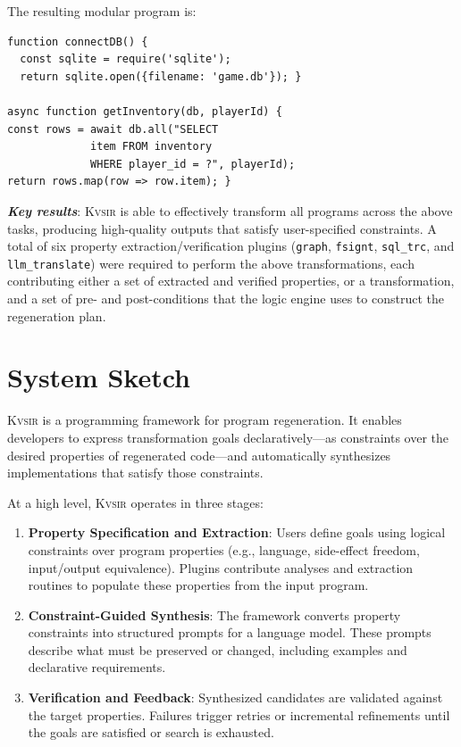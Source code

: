 \documentclass[sigplan,review,anonymous,10pt]{acmart}
\newcommand{\sys}{{\scshape Kv{\textalpha}sir}\xspace}
\newcommand{\heading}[1]{\vspace{2pt}\noindent\textbf{\emph{#1}}:\enspace}
\newcommand{\ttt}[1]{\texttt{#1}\xspace}
\begin{document}
The resulting modular program is:
\begin{verbatim}
function connectDB() {
  const sqlite = require('sqlite');
  return sqlite.open({filename: 'game.db'}); }

async function getInventory(db, playerId) {
const rows = await db.all("SELECT 
             item FROM inventory
             WHERE player_id = ?", playerId);
return rows.map(row => row.item); }
\end{verbatim}

\heading{Key results}
\sys is able to effectively transform all programs across the above tasks,
producing high-quality outputs that satisfy user-specified constraints.
A total
of six property extraction/verification plugins (\ttt{graph}, \ttt{fsignt}, \ttt{sql\_trc}, and \ttt{llm\_translate})
were required to perform the above transformations, each
contributing either a set of extracted and verified properties, or a
transformation, and a set of pre- and post-conditions that the logic engine
uses to construct the regeneration plan.

\section{System Sketch}
\label{sec:design}

\sys is a programming framework for program regeneration. It enables developers to express transformation goals declaratively—as constraints over the desired properties of regenerated code—and automatically synthesizes implementations that satisfy those constraints.

At a high level, \sys operates in three stages:

\begin{enumerate}
  \item \textbf{Property Specification and Extraction}: Users define goals using logical constraints over program properties (e.g., language, side-effect freedom, input/output equivalence). Plugins contribute analyses and extraction routines to populate these properties from the input program.
  \item \textbf{Constraint-Guided Synthesis}: The framework converts property constraints into structured prompts for a language model. These prompts describe what must be preserved or changed, including examples and declarative requirements.
  \item \textbf{Verification and Feedback}: Synthesized candidates are validated against the target properties. Failures trigger retries or incremental refinements until the goals are satisfied or search is exhausted.
\end{enumerate}
\end{document}
